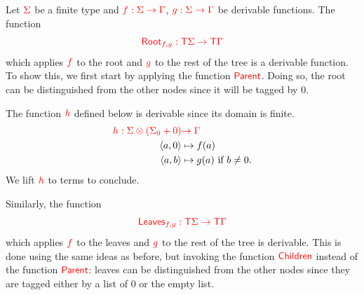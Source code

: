 \noindent  \begin{example} Let ${\color{red}{\Sigma}}$ be a finite type and ${\color{red}{f:{\color{red}{\Sigma}}\to {\color{red}{\Gamma}}}}$, ${\color{red}{g: {\color{red}{\Sigma}}\to {\color{red}{\Gamma}}}}$ be derivable functions. The function $${\color{red}{\mathsf{Root}_{f,g} : {\color{red}{\mathsf T}}{\color{red}{\Sigma}}\to {\color{red}{\mathsf T}}{\color{red}{\Gamma}}}}$$
which applies ${\color{red}{f}}$ to the root and ${\color{red}{g}}$ to the rest of the tree is a derivable function.
To show this, we first start by applying the function ${\color{red}{\mathsf{Parent}}}$. Doing so, the root can be distinguished from the other nodes since it will be tagged by $0$.  

The function ${\color{red}{h}}$ defined below is derivable since its domain is finite. 
\begin{align*}
{\color{red}{h:{\color{red}{\Sigma}}\otimes({\color{red}{\Sigma}}_0+0)}}&{\color{red}{\to {\color{red}{\Gamma}}}}\\
  \langle{a,0}\rangle &\mapsto f(a) \\
  \langle{a,b}\rangle &\mapsto g(a) \text{ if } b\neq 0.
\end{align*}
We lift ${\color{red}{h}}$ to terms to conclude.

\smallskip
Similarly, the function $${\color{red}{\mathsf{Leaves}_{f,g} : {\color{red}{\mathsf T}}{\color{red}{\Sigma}}\to {\color{red}{\mathsf T}}{\color{red}{\Gamma}}}}$$
 which applies ${\color{red}{f}}$ to the leaves and ${\color{red}{g}}$ to the rest of the tree is derivable. This is done using the same ideas as before, but invoking the function ${\color{red}{\mathsf{Children}}}$ instead of the function ${\color{red}{\mathsf{Parent}}}$: leaves can be distinguished from the other nodes since they are tagged either by a list of $0$ or the empty list.
\end{example}



